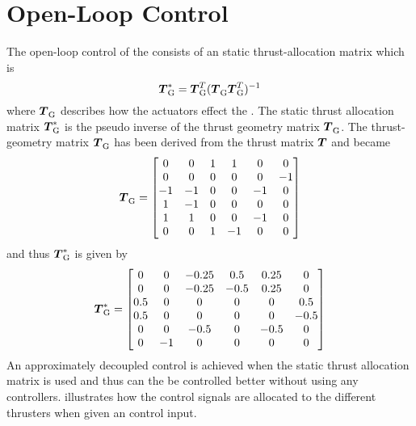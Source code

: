 \section{Open-Loop Control} \label{sec:openloop}   
The open-loop control of the \abbrROV consists of an static thrust-allocation matrix which is
\begin{equation}
    \thrusterGeometryOnes[*] = \thrusterGeometryOnes[T](\thrusterGeometryOnes \thrusterGeometryOnes[T])^{-1}
\end{equation}
where $\thrusterGeometryOnes$ describes how the actuators effect the \abbrROV \citep{thrustallocation}. The static thrust allocation matrix $\thrusterGeometryOnes[*]$ is the pseudo inverse of the thrust geometry matrix $\thrusterGeometryOnes$. The thrust-geometry matrix $\thrusterGeometryOnes$ has been derived from the thrust matrix $\thrusterGeometry$ and became 
\begin{equation*}
    \thrusterGeometryOnes = 
    \begin{bmatrix}
    0  & 0  & 1 & 1  &  0 &  0 \\
    0  & 0  & 0 & 0  &  0 & -1 \\
    -1 & -1 & 0 & 0  & -1 &  0 \\
    1  & -1 & 0 & 0  &  0 &  0 \\
    1  & 1  & 0 & 0  & -1 &  0 \\
    0  & 0  & 1 & -1 &  0 &  0 \\
    \end{bmatrix}
\end{equation*}
and thus $\thrusterGeometryOnes[*]$ is given by
\begin{equation}
\thrusterGeometryOnes[*] = \begin{bmatrix}
0 & 0 & -0.25 & 0.5 & 0.25 & 0 \\
0 & 0 & -0.25 & -0.5 & 0.25 & 0 \\
0.5 & 0 & 0 & 0 & 0 & 0.5 \\
0.5 & 0 & 0 & 0 & 0 & -0.5 \\
0 & 0 & -0.5 & 0 & -0.5 & 0 \\
0 & -1 & 0 & 0 & 0 & 0 \\
\end{bmatrix}
\end{equation}
An approximately decoupled control is achieved when the static thrust allocation matrix is used and thus can the \abbrROV be controlled better without using any controllers.  illustrates how the control signals are allocated to the different thrusters when given an control input.

